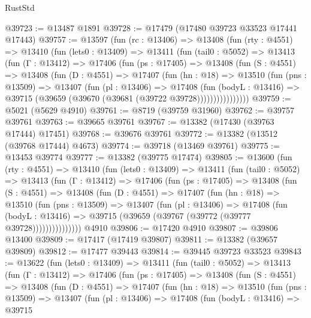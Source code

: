 \begin{lexlean}{RustStd}
\begin{coremodule}
@39723 := @13487 @1891
@39728 := @17479 (@17480 @39723 @33523 @17441 @17443)
@39757 := @13597
    (fun (rc : @13406) =>
    @13408
      (fun (rty : @4551) =>
      @13410
        (fun (lets0 : @13409) =>
        @13411
          (fun (tail0 : @5052) =>
          @13413
            (fun (Γ : @13412) =>
            @17406
              (fun (ps : @17405) =>
              @13408
                (fun (S : @4551) =>
                @13408
                  (fun (D : @4551) =>
                  @17407
                    (fun (hn : @18) =>
                    @13510
                      (fun (pns : @13509) =>
                      @13407
                        (fun (pl : @13406) =>
                        @17408
                          (fun (bodyL : @13416) =>
                          @39715 (@39659 (@39670 (@39681 (@39722 @39728))))))))))))))))
@39759 := @5021 (@5629 @4910)
@39761 := @8719 (@39759 @31960)
@39762 := @39757 @39761
@39763 := @39665 @39761
@39767 := @13382 (@17430 (@39763 @17444) @17451)
@39768 := @39676 @39761
@39772 := @13382 (@13512 (@39768 @17444) @4673)
@39774 := @39718 (@13469 @39761)
@39775 := @13453 @39774
@39777 := @13382 (@39775 @17474)
@39805 := @13600
    (fun (rty : @4551) =>
    @13410
      (fun (lets0 : @13409) =>
      @13411
        (fun (tail0 : @5052) =>
        @13413
          (fun (Γ : @13412) =>
          @17406
            (fun (ps : @17405) =>
            @13408
              (fun (S : @4551) =>
              @13408
                (fun (D : @4551) =>
                @17407
                  (fun (hn : @18) =>
                  @13510
                    (fun (pns : @13509) =>
                    @13407
                      (fun (pl : @13406) =>
                      @17408
                        (fun (bodyL : @13416) =>
                        @39715 (@39659 (@39767 (@39772 (@39777 @39728)))))))))))))))
    @4910
@39806 := @17420 @4910
@39807 := @39806 @13400
@39809 := @17417 (@17419 @39807)
@39811 := @13382 (@39657 @39809)
@39812 := @17477 @39443
@39814 := @39445 @39723 @33523
@39843 := @13622
    (fun (lets0 : @13409) =>
    @13411
      (fun (tail0 : @5052) =>
      @13413
        (fun (Γ : @13412) =>
        @17406
          (fun (ps : @17405) =>
          @13408
            (fun (S : @4551) =>
            @13408
              (fun (D : @4551) =>
              @17407
                (fun (hn : @18) =>
                @13510
                  (fun (pns : @13509) =>
                  @13407
                    (fun (pl : @13406) =>
                    @17408
                      (fun (bodyL : @13416) =>
                      @39715

\end{coremodule}
\end{lexlean}
